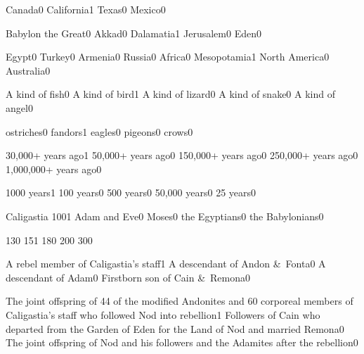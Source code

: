 {Canada}{0}
{California}{1}
{Texas}{0}
{Mexico}{0}
\qstop



{Babylon the Great}{0}
{Akkad}{0}
{Dalamatia}{1}
{Jerusalem}{0}
{Eden}{0}
\qstop

{Egypt}{0}
{Turkey}{0}
{Armenia}{0}
{Russia}{0}
{Africa}{0}
{Mesopotamia}{1}
{North America}{0}
{Australia}{0}
\qstop

{A kind of fish}{0}
{A kind of bird}{1}
{A kind of lizard}{0}
{A kind of snake}{0}
{A kind of angel}{0}
\qstop

{ostriches}{0}
{fandors}{1}
{eagles}{0}
{pigeons}{0}
{crows}{0}
\qstop

{30,000+ years ago}{1}
{50,000+ years ago}{0}
{150,000+ years ago}{0}
{250,000+ years ago}{0}
{1,000,000+ years ago}{0}
\qstop

{1000 years}{1}
{100 years}{0}
{500 years}{0}
{50,000 years}{0}
{25 years}{0}
\qstop

{Caligastia 100}{1}
{Adam and Eve}{0}
{Moses}{0}
{the Egyptians}{0}
{the Babylonians}{0}
\qstop

{13}{0}
{15}{1}
{18}{0}
{20}{0}
{30}{0}
\qstop


{A rebel member of Caligastia's staff}{1}
{A descendant of Andon \&\ Fonta}{0}
{A descendant of Adam}{0}
{Firstborn son of Cain \&\ Remona}{0}
\qstop

{The joint offspring of 44 of the modified Andonites and 60 corporeal members of Caligastia's staff who followed Nod into rebellion}{1}
{Followers of Cain who departed from the Garden of Eden for the Land of Nod and married Remona}{0}
{The joint offspring of Nod and his followers and the Adamites after the rebellion}{0}
\qstop


